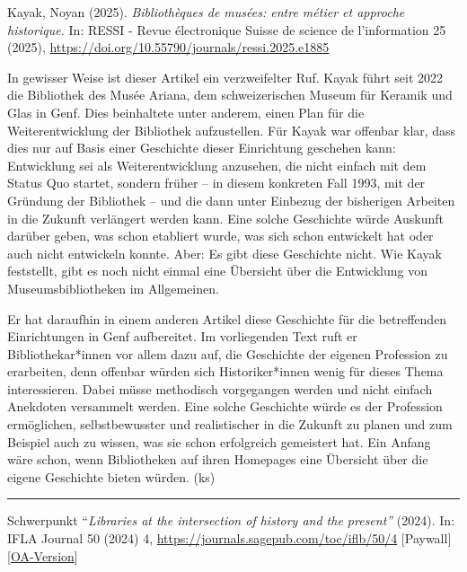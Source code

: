 \documentclass[a4paper,
fontsize=11pt,
oneside,
numbers=noperiodatend,
parskip=half-,
bibliography=totoc,
final
]{scrartcl}
\begin{document}
Kayak, Noyan (2025). \emph{Bibliothèques de musées: entre métier et
approche historique.} In: RESSI - Revue électronique Suisse de science
de l'information 25 (2025),
\url{https://doi.org/10.55790/journals/ressi.2025.e1885}

In gewisser Weise ist dieser Artikel ein verzweifelter Ruf. Kayak führt
seit 2022 die Bibliothek des Musée Ariana, dem schweizerischen Museum
für Keramik und Glas in Genf. Dies beinhaltete unter anderem, einen Plan
für die Weiterentwicklung der Bibliothek aufzustellen. Für Kayak war
offenbar klar, dass dies nur auf Basis einer Geschichte dieser
Einrichtung geschehen kann: Entwicklung sei als Weiterentwicklung
anzusehen, die nicht einfach mit dem Status Quo startet, sondern früher
-- in diesem konkreten Fall 1993, mit der Gründung der Bibliothek -- und
die dann unter Einbezug der bisherigen Arbeiten in die Zukunft
verlängert werden kann. Eine solche Geschichte würde Auskunft darüber
geben, was schon etabliert wurde, was sich schon entwickelt hat oder
auch nicht entwickeln konnte. Aber: Es gibt diese Geschichte nicht. Wie
Kayak feststellt, gibt es noch nicht einmal eine Übersicht über die
Entwicklung von Museumsbibliotheken im Allgemeinen.

Er hat daraufhin in einem anderen Artikel diese Geschichte für die
betreffenden Einrichtungen in Genf aufbereitet. Im vorliegenden Text
ruft er Bibliothekar*innen vor allem dazu auf, die Geschichte der
eigenen Profession zu erarbeiten, denn offenbar würden sich
Historiker*innen wenig für dieses Thema interessieren. Dabei müsse
methodisch vorgegangen werden und nicht einfach Anekdoten versammelt
werden. Eine solche Geschichte würde es der Profession ermöglichen,
selbstbewusster und realistischer in die Zukunft zu planen und zum
Beispiel auch zu wissen, was sie schon erfolgreich gemeistert hat. Ein
Anfang wäre schon, wenn Bibliotheken auf ihren Homepages eine Übersicht
über die eigene Geschichte bieten würden. (ks)

\begin{center}\rule{0.5\linewidth}{0.5pt}\end{center}

Schwerpunkt ``\emph{Libraries at the intersection of history and the
present''} (2024). In: IFLA Journal 50 (2024) 4,
\url{https://journals.sagepub.com/toc/iflb/50/4} {[}Paywall{]}
{[}\href{https://repository.ifla.org/handle/20.500.14598/3703}{OA-Version}{]}
\end{document}
